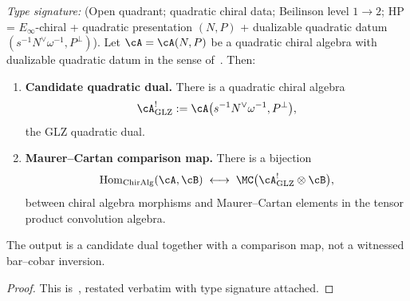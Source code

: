 \begin{theorem}
\label{thm:glz-quadratic-duality-scope}
\emph{Type signature:} (Open quadrant; quadratic chiral data;
Beilinson level $1\!\rightarrow\!2$; HP = $E_\infty$-chiral +
quadratic presentation $(N,P)$ + dualizable quadratic datum
$(s^{-1}N^\vee\omega^{-1}, P^\perp)$).
Let $\cA = \cA(N,P)$ be a quadratic chiral algebra with dualizable
quadratic datum in the sense of~\cite{GLZ22}. Then:
\begin{enumerate}[label=\textup{(\arabic*)}]
\item \textbf{Candidate quadratic dual.} There is a quadratic chiral
algebra
\[
\cA^!_{\mathrm{GLZ}} := \cA\bigl(s^{-1}N^\vee\omega^{-1}, P^\perp\bigr),
\]
the GLZ quadratic dual.

\item \textbf{Maurer--Cartan comparison map.} There is a bijection
\[
\operatorname{Hom}_{\mathrm{ChirAlg}}(\cA, \cB)
\;\longleftrightarrow\;
\MC\bigl(\cA^!_{\mathrm{GLZ}} \otimes \cB\bigr),
\]
between chiral algebra morphisms and Maurer--Cartan elements in the
tensor product convolution algebra.
\end{enumerate}
The output is a candidate dual together with a comparison map, not a
witnessed bar--cobar inversion.
\end{theorem}

\begin{proof}
This is~\cite[Proposition~3.2 and Theorem~5.3]{GLZ22}, restated
verbatim with type signature attached.
\end{proof}

